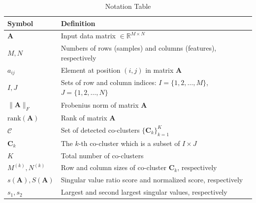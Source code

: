 \documentclass[journal]{IEEEtran}
\theoremstyle{definition}
\theoremstyle{remark} %
\begin{document}
    {\color{blue}
        \begin{table}[htbp]
            \centering
            \caption{Notation Table}
            \label{tab:notation}
            \begin{tabular}{@{} p{} p{} @{}}
                \toprule
                \textbf{Symbol}                    & \textbf{Definition}                                                             \\
                \midrule
                $\mathbf{A}$                       & Input data matrix $\in \mathbb{R}^{M \times N}$                                 \\
                $M, N$                             & Numbers of rows (samples) and columns (features), respectively                                 \\
                $a_{ij}$                           & Element at position $(i,j)$ in matrix $\mathbf{A}$                              \\
                $I, J$                             & Sets of row and column indices: $I = \{1,2,\ldots,M\}$, $J = \{1,2,\ldots,N\}$  \\
                $\|\mathbf{A}\|_F$                 & Frobenius norm of matrix $\mathbf{A}$                                           \\
                $\text{rank}(\mathbf{A})$          & Rank of matrix $\mathbf{A}$                                                     \\
                $\mathcal{C}$                      & Set of detected co-clusters $\{\mathbf{C}_k\}_{k=1}^K$                        \\
                $\mathbf{C}_k$                     & The $k$-th co-cluster which is a subset of $I \times J$                                       \\
                $K$                                & Total number of co-clusters                                                     \\
                $M^{(k)}, N^{(k)}$                 & Row and column sizes of co-cluster $\mathbf{C}_k$, respectively                               \\
                $s(\mathbf{A}), S(\mathbf{A})$     & Singular value ratio score and normalized score, respectively                                 \\
                $s_1, s_2$                         & Largest and second largest singular values, respectively                                      \\

\end{tabular}
\end{table}}
\end{document}
